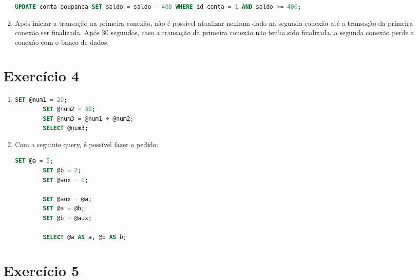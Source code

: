 \documentclass{article}
\begin{document}
\begin{enumerate}[label=\alph*)]
    \begin{lstlisting}[language=SQL]
        UPDATE conta_poupanca SET saldo = saldo - 400 WHERE id_conta = 1 AND saldo >= 400;
    \end{lstlisting}

    \item Após iniciar a transação na primeira conexão, não é possível atualizar nenhum dado na segunda conexão até a transação da primeira conexão ser finalizada. Após 30 segundos, caso a transação da primeira conexão não tenha sido finalizada, a segunda conexão perde a conexão com o banco de dados.
    
\end{enumerate}

\section*{Exercício 4}

\begin{enumerate}[label=\alph*)]

    \item
    \begin{lstlisting}[language=SQL]
        SET @num1 = 20;
        SET @num2 = 30;
        SET @num3 = @num1 + @num2;
        SELECT @num3;
    \end{lstlisting}

    \item Com a seguinte query, é possível fazer o pedido:
    \begin{lstlisting}[language=SQL]
        SET @a = 5;
        SET @b = 2;
        SET @aux = 0;

        SET @aux = @a;
        SET @a = @b;
        SET @b = @aux;

        SELECT @a AS a, @b AS b;
    \end{lstlisting}

\end{enumerate}

\section*{Exercício 5}
\end{document}

